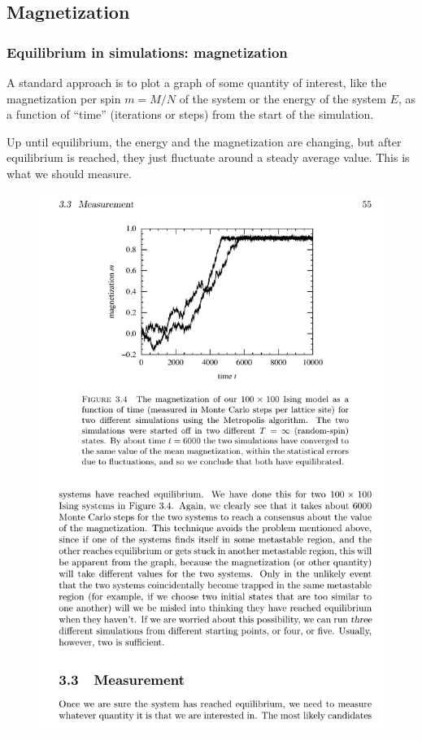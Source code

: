 \documentclass[hyperref={colorlinks=true}]{beamer}
\begin{document}
\subsection[Magnetization]{Magnetization}

\begin{frame}%
  \frametitle{Equilibrium in simulations: magnetization}
 
  A standard approach is to plot a graph of some quantity of interest, like the magnetization per spin $m=M/N$ of the system or the energy of the system $E$, as a function of ``time'' (iterations or steps) from the start of the simulation. 
  
  \vspace{0.3cm}
  
  Up until equilibrium, the energy and the magnetization are changing, but after equilibrium is reached, they just fluctuate around a steady average value. This is what we should measure.
  
  \begin{figure}
    \includegraphics[width=0.6\columnwidth]{MagnetizationVsTime.pdf}
  \end{figure}
 
\end{frame}
\end{document}

